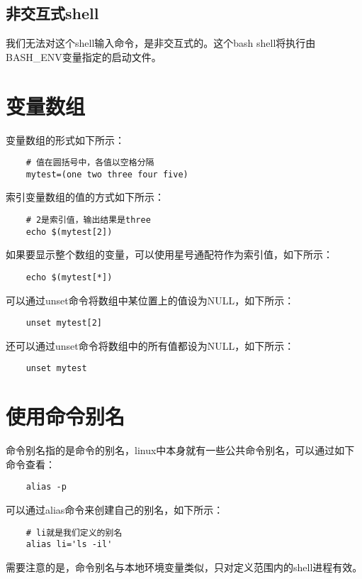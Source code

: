 \documentclass[a4paper,left=2.5cm,right=2.5cm,11pt]{article}
\begin{document}
\subsection{非交互式shell}
	我们无法对这个shell输入命令，是非交互式的。这个bash shell将执行由BASH\_ENV变量指定的启动文件。

\section{变量数组}
	变量数组的形式如下所示：
	\begin{lstlisting}
	# 值在圆括号中，各值以空格分隔
	mytest=(one two three four five)
	\end{lstlisting}

	索引变量数组的值的方式如下所示：
	\begin{lstlisting}
	# 2是索引值，输出结果是three
	echo $(mytest[2])
	\end{lstlisting}

	如果要显示整个数组的变量，可以使用星号通配符作为索引值，如下所示：
	\begin{lstlisting}
	echo $(mytest[*])
	\end{lstlisting}

	可以通过unset命令将数组中某位置上的值设为NULL，如下所示：
	\begin{lstlisting}
	unset mytest[2]
	\end{lstlisting}

	还可以通过unset命令将数组中的所有值都设为NULL，如下所示：
	\begin{lstlisting}
	unset mytest
	\end{lstlisting}

\section{使用命令别名}
	命令别名指的是命令的别名，linux中本身就有一些公共命令别名，可以通过如下命令查看：
	\begin{lstlisting}
	alias -p
	\end{lstlisting}

	可以通过alias命令来创建自己的别名，如下所示：
	\begin{lstlisting}
	# li就是我们定义的别名
	alias li='ls -il'
	\end{lstlisting}

	需要注意的是，命令别名与本地环境变量类似，只对定义范围内的shell进程有效。
  
\end{document}
